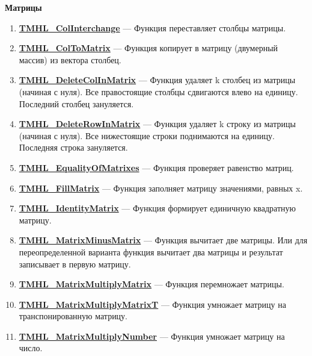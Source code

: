 \documentclass[a4paper,12pt]{article}
\begin{document}
\textbf{Матрицы}
\begin{enumerate}

\item \textbf{\hyperref[TMHL_ColInterchange]{TMHL\_ColInterchange}} --- Функция переставляет столбцы матрицы.

\item \textbf{\hyperref[TMHL_ColToMatrix]{TMHL\_ColToMatrix}} --- Функция копирует в матрицу (двумерный массив) из вектора столбец.

\item \textbf{\hyperref[TMHL_DeleteColInMatrix]{TMHL\_DeleteColInMatrix}} --- Функция удаляет k столбец из матрицы (начиная с нуля). Все правостоящие столбцы сдвигаются влево  на единицу. Последний столбец зануляется.

\item \textbf{\hyperref[TMHL_DeleteRowInMatrix]{TMHL\_DeleteRowInMatrix}} --- Функция удаляет k строку из матрицы (начиная с нуля). Все нижестоящие строки поднимаются на единицу. Последняя строка зануляется.

\item \textbf{\hyperref[TMHL_EqualityOfMatrixes]{TMHL\_EqualityOfMatrixes}} --- Функция проверяет равенство матриц.

\item \textbf{\hyperref[TMHL_FillMatrix]{TMHL\_FillMatrix}} --- Функция заполняет матрицу значениями, равных x.

\item \textbf{\hyperref[TMHL_IdentityMatrix]{TMHL\_IdentityMatrix}} --- Функция формирует единичную квадратную матрицу.

\item \textbf{\hyperref[TMHL_MatrixMinusMatrix]{TMHL\_MatrixMinusMatrix}} --- Функция вычитает две матрицы. Или для переопределенной варианта функция вычитает два матрицы и результат записывает в первую матрицу. 

\item \textbf{\hyperref[TMHL_MatrixMultiplyMatrix]{TMHL\_MatrixMultiplyMatrix}} --- Функция перемножает матрицы.

\item \textbf{\hyperref[TMHL_MatrixMultiplyMatrixT]{TMHL\_MatrixMultiplyMatrixT}} --- Функция умножает матрицу на транспонированную матрицу.

\item \textbf{\hyperref[TMHL_MatrixMultiplyNumber]{TMHL\_MatrixMultiplyNumber}} --- Функция умножает матрицу на число.


\end{enumerate}
\end{document}
